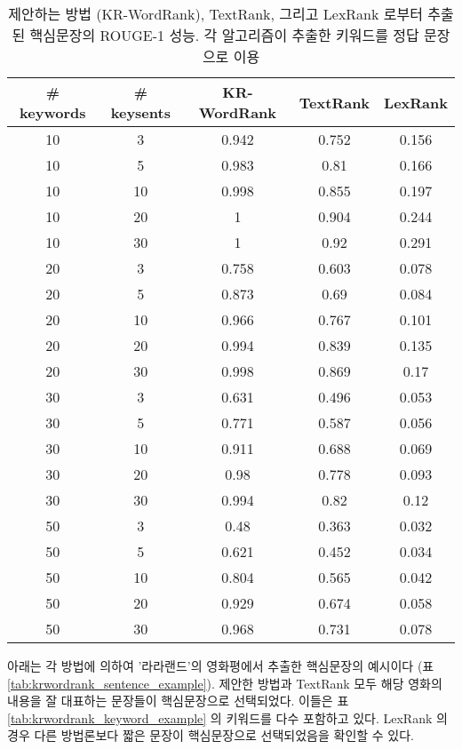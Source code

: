 \documentclass[oneside, ko,phd]{snuthesis_utf8_kor}
\begin{document}
\begin{table}[H]
\centering
\small
\label{tab:krwordrank_sentence_performance}
\caption{제안하는 방법 (KR-WordRank), TextRank, 그리고 LexRank 로부터 추출된 핵심문장의 ROUGE-1 성능. 각 알고리즘이 추출한 키워드를 정답 문장으로 이용}
\begin{tabular}{|c|c|c|c|c|}
\hline
\textbf{\# keywords} & \textbf{\# keysents} & \textbf{KR-WordRank} & \textbf{TextRank} & \textbf{LexRank} \\ \hline
10 & 3 & 0.942 & 0.752 & 0.156 \\ \hline
10 & 5 & 0.983 & 0.81 & 0.166 \\ \hline
10 & 10 & 0.998 & 0.855 & 0.197 \\ \hline
10 & 20 & 1 & 0.904 & 0.244 \\ \hline
10 & 30 & 1 & 0.92 & 0.291 \\ \hline
20 & 3 & 0.758 & 0.603 & 0.078 \\ \hline
20 & 5 & 0.873 & 0.69 & 0.084 \\ \hline
20 & 10 & 0.966 & 0.767 & 0.101 \\ \hline
20 & 20 & 0.994 & 0.839 & 0.135 \\ \hline
20 & 30 & 0.998 & 0.869 & 0.17 \\ \hline
30 & 3 & 0.631 & 0.496 & 0.053 \\ \hline
30 & 5 & 0.771 & 0.587 & 0.056 \\ \hline
30 & 10 & 0.911 & 0.688 & 0.069 \\ \hline
30 & 20 & 0.98 & 0.778 & 0.093 \\ \hline
30 & 30 & 0.994 & 0.82 & 0.12 \\ \hline
50 & 3 & 0.48 & 0.363 & 0.032 \\ \hline
50 & 5 & 0.621 & 0.452 & 0.034 \\ \hline
50 & 10 & 0.804 & 0.565 & 0.042 \\ \hline
50 & 20 & 0.929 & 0.674 & 0.058 \\ \hline
50 & 30 & 0.968 & 0.731 & 0.078 \\ \hline
\end{tabular}
\end{table}

아래는 각 방법에 의하여 '라라랜드'의 영화평에서 추출한 핵심문장의 예시이다 (표 \ref{tab:krwordrank_sentence_example}).
제안한 방법과 TextRank 모두 해당 영화의 내용을 잘 대표하는 문장들이 핵심문장으로 선택되었다.
이들은 표 \ref{tab:krwordrank_keyword_example} 의 키워드를 다수 포함하고 있다.
LexRank 의 경우 다른 방법론보다 짧은 문장이 핵심문장으로 선택되었음을 확인할 수 있다.
\end{document}
